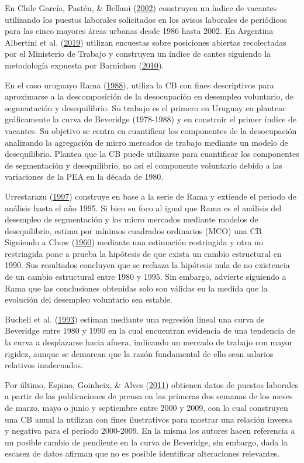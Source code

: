\documentclass[12pt,oneside]{reedthesis}
\begin{document}
En Chile García, Pastén, \& Bellani (\protect\hyperlink{ref-BankChile2002}{2002}) construyen un índice de vacantes utilizando los puestos laborales solicitados en los avisos laborales de periódicos para las cinco mayores áreas urbanas desde 1986 hasta 2002.
En Argentina Albertini et al. (\protect\hyperlink{ref-ArgentinaBC2019}{2019}) utilizan encuestas sobre posiciones abiertas recolectadas por el Ministerio de Trabajo y construyen un índice de cantes siguiendo la metodología expuesta por Barnichon (\protect\hyperlink{ref-Barnichon2010}{2010}).

En el caso uruguayo Rama (\protect\hyperlink{ref-Rama1988}{1988}), utiliza la CB con fines descriptivos para aproximarse a la descomposición de la desocupación en desempleo voluntario, de segmentación y desequilibrio. Su trabajo es el primero en Uruguay en plantear gráficamente la curva de Beveridge (1978-1988) y en construir el primer índice de vacantes. Su objetivo se centra en cuantificar los componentes de la desocupación analizando la agregación de micro mercados de trabajo mediante un modelo de desequilibrio. Plantea que la CB puede utilizarse para cuantificar los componentes de segmentación y desequilibrio, no así el componente voluntario debido a las variaciones de la PEA en la década de 1980.

Urrestarazu (\protect\hyperlink{ref-Urrestarazu1997}{1997}) construye en base a la serie de Rama y extiende el periodo de análisis hasta el año 1995. Si bien su foco al igual que Rama es el análisis del desempleo de segmentación y los micro mercados mediante modelos de desequilibrio, estima por mínimos cuadrados ordinarios (MCO) una CB. Siguiendo a Chow (\protect\hyperlink{ref-Chow1960}{1960}) mediante una estimación restringida y otra no restringida pone a prueba la hipótesis de que exista un cambio estructural en 1990. Sus resultados concluyen que se rechaza la hipótesis nula de no existencia de un cambio estructural entre 1980 y 1995. Sin embargo, advierte siguiendo a Rama que las conclusiones obtenidas solo son válidas en la medida que la evolución del desempleo voluntario sea estable.

Bucheli et al. (\protect\hyperlink{ref-DECON1993}{1993}) estiman mediante una regresión lineal una curva de Beveridge entre 1980 y 1990 en la cual encuentran evidencia de una tendencia de la curva a desplazarse hacia afuera, indicando un mercado de trabajo con mayor rigidez, aunque se demarcan que la razón fundamental de ello sean salarios relativos inadecuados.

Por último, Espino, Goinheix, \& Alves (\protect\hyperlink{ref-Alma2011}{2011}) obtienen datos de puestos laborales a partir de las publicaciones de prensa en las primeras dos semanas de los meses de marzo, mayo o junio y septiembre entre 2000 y 2009, con lo cual construyen una CB anual la utilizan con fines ilustrativos para mostrar una relación inversa y negativa para el periodo 2000-2009. En la misma los autores hacen referencia a un posible cambio de pendiente en la curva de Beveridge, sin embargo, dada la escasez de datos afirman que no es posible identificar alteraciones relevantes.
\end{document}
